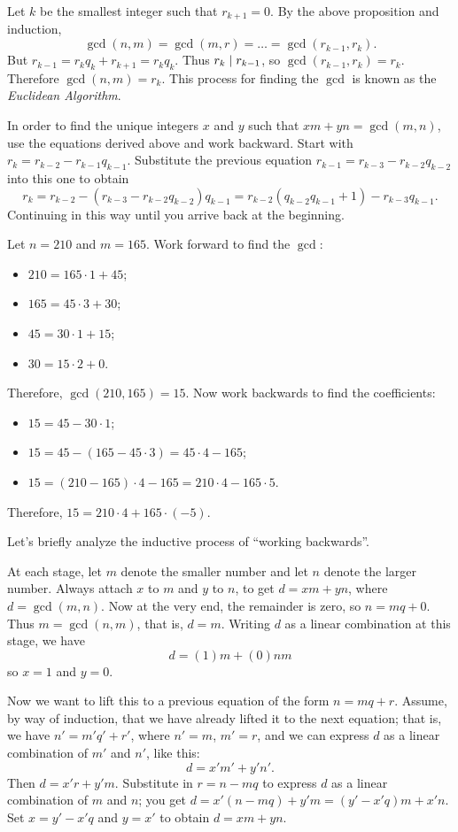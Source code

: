 \documentclass{amsart}
\begin{document}
Let $k$ be the smallest integer such that $r_{k+1} = 0$. By the
above proposition and induction,
\[ \gcd(n,m) = \gcd(m,r) = \dots = \gcd(r_{k-1},r_{k}) . \]
But $r_{k-1} = r_{k}q_{k} + r_{k+1} = r_{k}q_{k}$. Thus $r_{k}
\mid r_{k-1}$, so $\gcd(r_{k-1},r_{k}) = r_{k}$. Therefore
$\gcd(n,m) = r_{k}$.  This process for finding the $\gcd$ is known
as the {\em Euclidean Algorithm}.

In order to find the unique integers $x$ and $y$ such that $xm +
yn = \gcd(m,n)$, use the equations derived above and work
backward. Start with $r_{k} = r_{k-2} - r_{k-1}q_{k-1}$.
Substitute the previous equation $r_{k-1} = r_{k-3} -
r_{k-2}q_{k-2}$ into this one to obtain
\[ r_{k} = r_{k-2} - (r_{k-3} - r_{k-2}q_{k-2})q_{k-1}
        = r_{k-2}(q_{k-2}q_{k-1}+1) - r_{k-3}q_{k-1} . \]
Continuing in this way until you arrive back at the beginning.

\begin{Exm}
Let $n = 210$ and $m = 165$. Work forward to find the $\gcd$:
\begin{itemize}
\item $210 = 165 \cdot 1 + 45$; \item $165 = 45 \cdot 3 + 30$;
\item $45 = 30 \cdot 1 + 15$; \item $30 = 15 \cdot 2 + 0$.
\end{itemize}
Therefore, $\gcd(210,165) = 15$.  Now work backwards to find the
coefficients:
\begin{itemize}
\item $15 = 45 - 30 \cdot 1$; \item $15 = 45 - (165 - 45 \cdot 3)
= 45 \cdot 4 - 165$; \item $15 = (210 - 165) \cdot 4 - 165 = 210
\cdot 4 - 165 \cdot 5$.
\end{itemize}
Therefore, $15 = 210 \cdot 4 + 165 \cdot (-5)$.
\end{Exm}

Let's briefly analyze the inductive process of ``working
backwards''.

At each stage, let $m$ denote the smaller number and let $n$ denote the larger number.
Always attach $x$ to $m$ and $y$ to $n$, to get $d = xm + yn$, where $d = \gcd(m,n)$.
Now at the very end, the remainder is zero, so
$n = mq + 0$.
Thus $m = \gcd(n,m)$, that is, $d = m$.
Writing $d$ as a linear combination at this stage, we have
\[ d = (1)m + (0) n m \]
so $x = 1$ and $y = 0$.

Now we want to lift this to a previous equation of the form $n = mq + r$.
Assume, by way of induction, that we have already lifted it to the
next equation; that is, we have $n' = m' q' + r'$,
where $n' = m$, $m' = r$, and we can express $d$ as a linear combination of $m'$ and $n'$,
like this:
\[ d = x' m' + y' n' . \]
Then $d = x' r + y' m$.  Substitute in $r = n - mq$ to express $d$ as a linear combination
of $m$ and $n$; you get $d = x'(n - mq) + y' m = (y' - x'q)m + x' n$.
Set $x = y' - x'q$ and $y = x'$ to obtain $d = xm + yn$.
\end{document}
